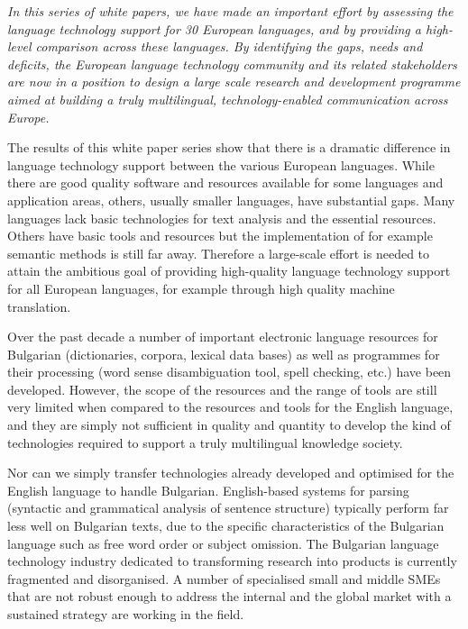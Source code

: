 \begin{multicols}{2}
  \emph{In this series of white papers, we have made an important effort by assessing the language technology support for 30 European languages, and by providing a high-level comparison across these languages. By identifying the gaps, needs and deficits, the European language technology community and its related stakeholders are now in a position to design a large scale research and development programme aimed at building a truly multilingual, technology-enabled communication across Europe.}

  The results of this white paper series show that there is a dramatic difference in language technology support between the various European languages. While there are good quality software and resources available for some languages and application areas, others, usually smaller languages, have substantial gaps. Many languages lack basic technologies for text analysis and the essential resources. Others have basic tools and resources but the implementation of for example semantic methods is still far away. Therefore a large-scale effort is needed to attain the ambitious goal of providing high-quality language technology support for all European languages, for example through high quality machine translation. 

  Over the past decade a number of important electronic language resources for Bulgarian (dictionaries, corpora, lexical data bases) as well as programmes for their processing (word sense disambiguation tool, spell checking, etc.) have been developed. However, the scope of the resources and the range of tools are still very limited when compared to the resources and tools for the English language, and they are simply not sufficient in quality and quantity to develop the kind of technologies required to support a truly multilingual knowledge society.
\columnbreak

  Nor can we simply transfer technologies already developed and optimised for the English language to handle Bulgarian. English-based systems for parsing (syntactic and grammatical analysis of sentence structure) typically perform far less well on Bulgarian texts, due to the specific characteristics of the Bulgarian language such as free word order or subject omission.
  The Bulgarian language technology industry dedicated to transforming research into products is currently fragmented and disorganised. A number of specialised small and middle SMEs that are not robust enough to address the internal and the global market with a sustained strategy are working in the field.


\end{multicols}
